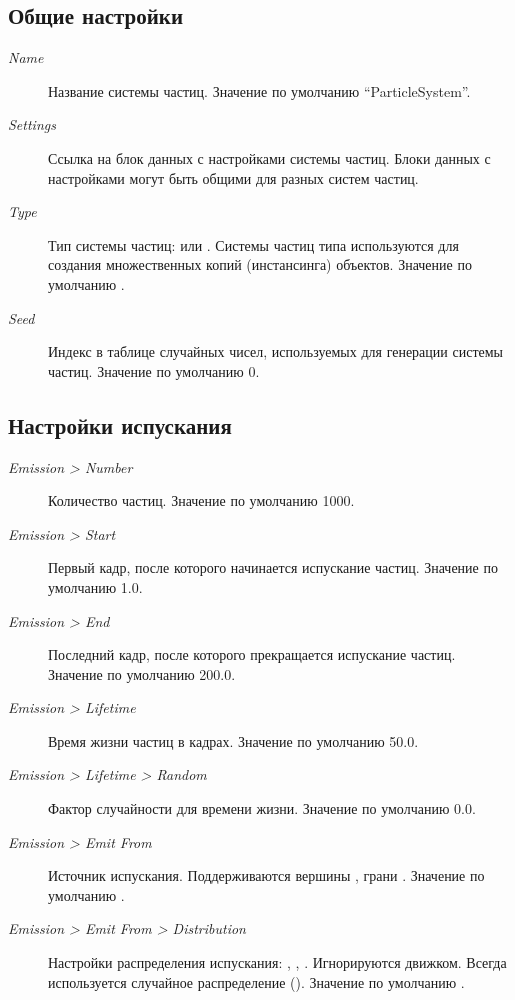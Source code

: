 \documentclass[a4paper,12pt,oneside]{sphinxmanual}
\begin{document}
\subsection{Общие настройки}
\label{particles:id6}\begin{description}
\item[{\emph{Name}}] \leavevmode
Название системы частиц. Значение по умолчанию ``ParticleSystem''.

\item[{\emph{Settings}}] \leavevmode
Ссылка на блок данных с настройками системы частиц. Блоки данных с настройками могут быть общими для разных систем частиц.

\item[{\emph{Type}}] \leavevmode
Тип системы частиц:  или . Системы частиц типа  используются для создания множественных копий (инстансинга) объектов. Значение по умолчанию .

\item[{\emph{Seed}}] \leavevmode
Индекс в таблице случайных чисел, используемых для генерации системы частиц. Значение по умолчанию 0.

\end{description}


\subsection{Настройки испускания}
\label{particles:id7}\begin{description}
\item[{\emph{Emission \textgreater{} Number}}] \leavevmode
Количество частиц. Значение по умолчанию 1000.

\item[{\emph{Emission \textgreater{} Start}}] \leavevmode
Первый кадр, после которого начинается испускание частиц. Значение по умолчанию 1.0.

\item[{\emph{Emission \textgreater{} End}}] \leavevmode
Последний кадр, после которого прекращается испускание частиц. Значение по умолчанию 200.0.

\item[{\emph{Emission \textgreater{} Lifetime}}] \leavevmode
Время жизни частиц в кадрах. Значение по умолчанию 50.0.

\item[{\emph{Emission \textgreater{} Lifetime \textgreater{} Random}}] \leavevmode
Фактор случайности для времени жизни. Значение по умолчанию 0.0.

\item[{\emph{Emission \textgreater{} Emit From}}] \leavevmode
Источник испускания. Поддерживаются вершины , грани . Значение по умолчанию .

\item[{\emph{Emission \textgreater{} Emit From \textgreater{} Distribution}}] \leavevmode
Настройки распределения испускания: , , . Игнорируются движком. Всегда используется случайное распределение (). Значение по умолчанию .

\end{description}
\end{document}
